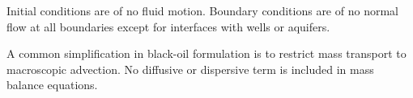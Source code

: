 \documentclass[final,authoryear,5p,twocolumn,10pt]{elsarticle}
\begin{document}
Initial conditions are of no fluid motion. Boundary conditions are of no normal flow at all boundaries except for interfaces with wells or aquifers.

A common simplification in black-oil formulation is to restrict mass transport to macroscopic advection. No diffusive or dispersive term is included in mass balance equations. 


\end{document}

